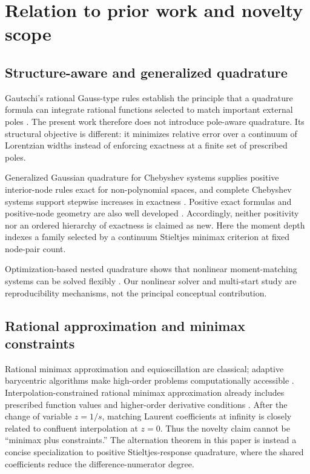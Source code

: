 \documentclass[preprint,12pt]{elsarticle}
\theoremstyle{remark}
\begin{document}
\section{Relation to prior work and novelty scope}

\subsection{Structure-aware and generalized quadrature}

Gautschi's rational Gauss-type rules establish the principle that a
quadrature formula can integrate rational functions selected to match
important external poles \cite{gautschi1993}. The present work therefore
does not introduce pole-aware quadrature. Its structural objective is
different: it minimizes relative error over a continuum of Lorentzian
widths instead of enforcing exactness at a finite set of prescribed
poles.

Generalized Gaussian quadrature for Chebyshev systems supplies positive
interior-node rules exact for non-polynomial spaces, and complete
Chebyshev systems support stepwise increases in exactness
\cite{huybrechs2017}. Positive exact formulas and positive-node
geometry are also well developed \cite{vandebos2019,glaubitz2020}.
Accordingly, neither positivity nor an ordered hierarchy of exactness is
claimed as new. Here the moment depth indexes a family selected by a
continuum Stieltjes minimax criterion at fixed node-pair count.

Optimization-based nested quadrature shows that nonlinear
moment-matching systems can be solved flexibly
\cite{keshavarzzadeh2018}. Our nonlinear solver and multi-start study
are reproducibility mechanisms, not the principal conceptual
contribution.

\subsection{Rational approximation and minimax constraints}

Rational minimax approximation and equioscillation are classical;
adaptive barycentric algorithms make high-order problems computationally
accessible \cite{filip2018}. Interpolation-constrained rational minimax
approximation already includes prescribed function values and
higher-order derivative conditions \cite{zhang2025}. After the change
of variable \(z=1/s\), matching Laurent coefficients at infinity is
closely related to confluent interpolation at \(z=0\). Thus the novelty
claim cannot be ``minimax plus constraints.'' The alternation theorem in
this paper is instead a concise specialization to positive
Stieltjes-response quadrature, where the shared coefficients reduce the
difference-numerator degree.
\end{document}
